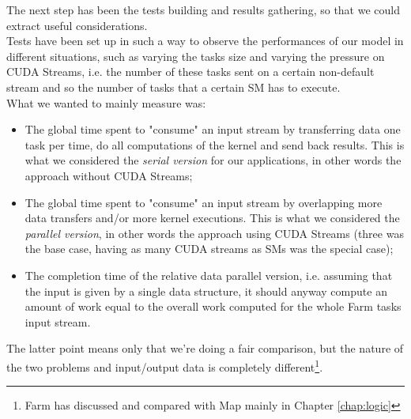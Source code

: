  The next step has been the tests building and results gathering, so that we could extract useful considerations.\\
 Tests have been set up in such a way to observe the performances of our model in different situations, such as varying the tasks size and varying the pressure on CUDA Streams, i.e. the number of these tasks sent on a certain non-default stream and so the number of tasks that a certain SM has to execute.\\
 What we wanted to mainly measure was:
 \begin{itemize}
 	\item The global time spent to "consume" an input stream by transferring data one task per time, do all computations of the kernel and send back results. This is what we considered the \textit{serial version} for our applications, in other words the approach without CUDA Streams;
 	
 	\item The global time spent to "consume" an input stream by overlapping more data transfers and/or more kernel executions. This is what we considered the \textit{parallel version}, in other words the approach using CUDA Streams (three was the base case, having as many CUDA streams as SMs was the special case);
 	
 	\item The completion time of the relative data parallel version, i.e. assuming that the input is given by a single data structure, it should anyway compute an amount of work equal to the overall work computed for the whole Farm tasks input stream. 	
 \end{itemize}
 The latter point means only that we're doing a fair comparison, but the nature of the two problems and input/output data is completely different\footnote{Farm has discussed and compared with Map mainly in Chapter \ref{chap:logic}}.
 
